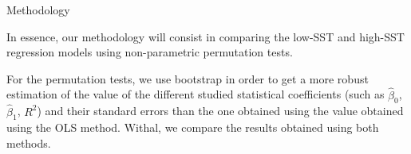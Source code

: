 \begin{block}{Methodology}


	In essence, our methodology will consist in comparing the low-SST and high-SST regression models using non-parametric permutation tests.

	\medskip
	For the permutation tests, we use bootstrap %
	\nocite{Analysis2003} %
	in order to get a more robust estimation of the value of the different studied statistical coefficients (such as $\hat{\beta}_{0}$, $\hat{\beta}_{1}$, $R^{2}$) and their standard errors than the one obtained using the value obtained using the OLS method. Withal, we compare the results obtained using both methods.

\end{block}

